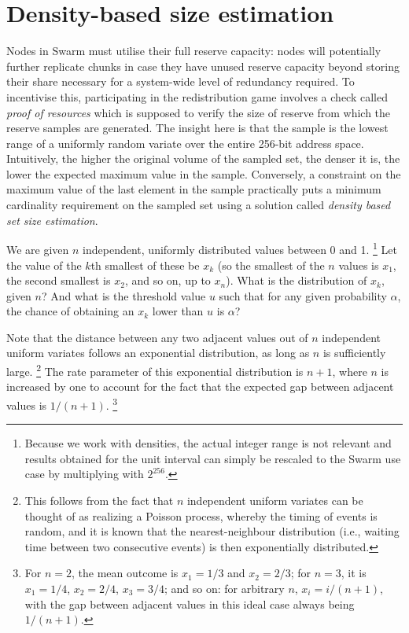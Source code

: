 \chapter{Density-based size estimation}\label{sec:density}

Nodes in Swarm must utilise their full reserve capacity: nodes will potentially further replicate chunks in case they have unused reserve capacity beyond storing their share necessary for a system-wide level of redundancy required. To incentivise this, participating in the redistribution game involves a check called \emph{proof of resources} which is supposed to verify the size of reserve from which the reserve samples are generated.
The insight here is that the sample is the lowest range of a uniformly random variate over the entire 256-bit address space. Intuitively, the higher the original volume of the sampled set, the denser it is, the lower the expected maximum value in the sample.
Conversely, a constraint on the maximum value of the last element in the sample practically puts a minimum cardinality requirement on the sampled set using a solution called \emph{density based set size estimation}.

We are given $n$ independent, uniformly distributed values between 0
and 1.%
%
\footnote{Because we work with densities, the actual integer range is not relevant and results obtained for the unit interval can simply be rescaled to the Swarm use case by multiplying with $2^{256}$.}
%
Let the value of the $k$th smallest of these be $x_k$ (so the
smallest of the $n$ values is $x_1$, the second smallest is $x_2$,
and so on, up to $x_n$). What is the distribution of $x_k$, given
$n$? And what is the threshold value $u$ such that for any given
probability $\alpha$, the chance of obtaining an $x_k$ lower than
$u$ is $\alpha$?

Note that the distance between any two adjacent
values out of $n$ independent uniform variates follows an exponential
distribution, as long as $n$ is sufficiently large.%
%
\footnote{This follows from
the fact that $n$ independent uniform variates can be thought of as realizing a Poisson process, whereby the timing of events is random, and
it is known that the nearest-neighbour distribution (i.e., waiting time
between two consecutive events) is then exponentially distributed.}
%
The rate parameter of this exponential distribution is $n+1$, where $n$
is increased by one to account for the fact that the expected gap
between adjacent values is $1/(n+1)$.%
%
\footnote{For $n=2$, the mean outcome
is $x_1 = 1/3$ and $x_2 = 2/3$; for $n = 3$, it is $x_1 = 1/4$,
$x_2 = 2/4$, $x_3 = 3/4$; and so on: for arbitrary $n$,
$x_i = i / (n+1)$, with the gap between adjacent values in this ideal
case always being $1/(n+1)$.}

